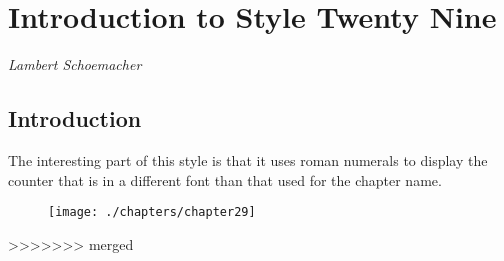 \chapter{Introduction to Style Twenty Nine}
\bigskip\bigskip

\textit{Lambert Schoemacher}
\bigskip\bigskip\bigskip\bigskip

\section{Introduction}
The interesting part of this style is that it uses roman numerals to display the counter that is in a different font than that used for the chapter name.
\medskip

\begin{figure}[ht]
\centering
\texttt{[image: ./chapters/chapter29]}
\end{figure}
\lipsum[3]

>>>>>>> merged
